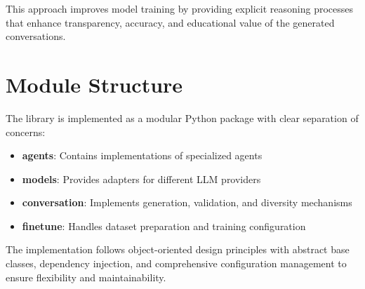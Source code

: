 This approach improves model training by providing explicit reasoning processes that enhance transparency, accuracy, and educational value of the generated conversations.

\section{Module Structure}

The library is implemented as a modular Python package with clear separation of concerns:

\begin{itemize}
    \item \textbf{agents}: Contains implementations of specialized agents
    
    \item \textbf{models}: Provides adapters for different LLM providers
    
    \item \textbf{conversation}: Implements generation, validation, and diversity mechanisms
    
    \item \textbf{finetune}: Handles dataset preparation and training configuration
\end{itemize}

The implementation follows object-oriented design principles with abstract base classes, dependency injection, and comprehensive configuration management to ensure flexibility and maintainability.
